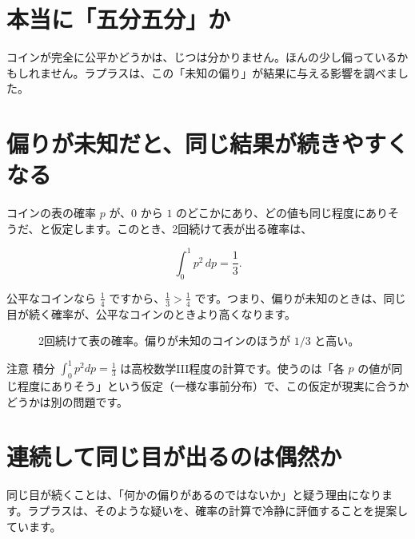 \documentclass[a4paper,11pt,openany]{ltjsbook}
\begin{document}
\section{本当に「五分五分」か}

コインが完全に公平かどうかは、じつは分かりません。ほんの少し偏っているかもしれません。ラプラスは、この「未知の偏り」が結果に与える影響を調べました。

\section{偏りが未知だと、同じ結果が続きやすくなる}

コインの表の確率 $p$ が、$0$ から $1$ のどこかにあり、どの値も同じ程度にありそうだ、と仮定します。このとき、2回続けて表が出る確率は、

\[
\int_0^1 p^2\,dp=\frac13.
\]

公平なコインなら $\frac14$ ですから、$\frac13>\frac14$ です。つまり、偏りが未知のときは、同じ目が続く確率が、公平なコインのときより高くなります。

\begin{figure}[htbp]
\centering
{}
\caption{2回続けて表の確率。偏りが未知のコインのほうが $1/3$ と高い。}
\end{figure}

\begin{notebox}{注意}
積分 $\int_0^1p^2dp=\frac13$ は高校数学III程度の計算です。使うのは「各 $p$ の値が同じ程度にありそう」という仮定（一様な事前分布）で、この仮定が現実に合うかどうかは別の問題です。
\end{notebox}

\section{連続して同じ目が出るのは偶然か}

同じ目が続くことは、「何かの偏りがあるのではないか」と疑う理由になります。ラプラスは、そのような疑いを、確率の計算で冷静に評価することを提案しています。
\end{document}
